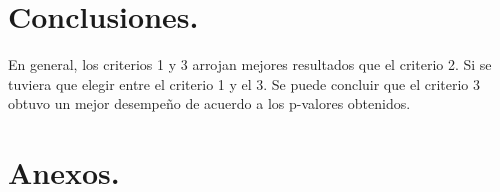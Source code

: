 \documentclass[12pt,3p]{elsarticle}
\begin{document}
\section{Conclusiones.}
En general, los criterios 1 y 3 arrojan mejores resultados que el criterio 2. Si se tuviera que elegir entre el criterio 1 y el 3. Se puede concluir que el criterio 3 obtuvo un mejor desempeño de acuerdo a los p-valores obtenidos.

\section{Anexos.}
\end{document}
